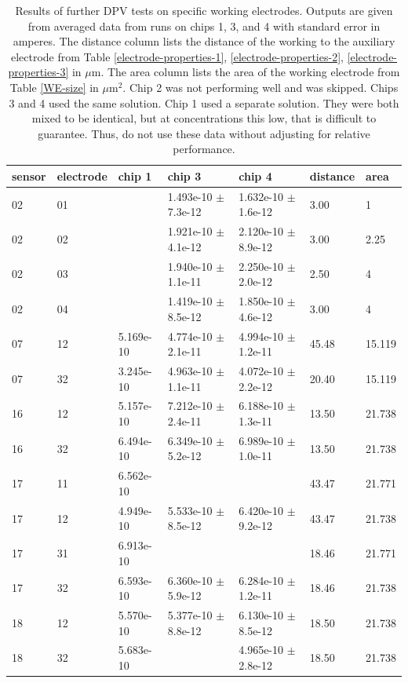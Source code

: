\begin{table}
	\begin{tabular}{lllllll}
		sensor & electrode & chip 1 & chip 3 & chip 4 & distance & area \\
		\hline
		02 & 01 &           & 1.493e-10 $\pm$ 7.3e-12 & 1.632e-10 $\pm$ 1.6e-12 &  3.00 & 1 \\
		02 & 02 &           & 1.921e-10 $\pm$ 4.1e-12 & 2.120e-10 $\pm$ 8.9e-12 &  3.00 & 2.25 \\
		02 & 03 &           & 1.940e-10 $\pm$ 1.1e-11 & 2.250e-10 $\pm$ 2.0e-12 &  2.50 & 4 \\
		02 & 04 &           & 1.419e-10 $\pm$ 8.5e-12 & 1.850e-10 $\pm$ 4.6e-12 &  3.00 & 4 \\
		07 & 12 & 5.169e-10 & 4.774e-10 $\pm$ 2.1e-11 & 4.994e-10 $\pm$ 1.2e-11 & 45.48 & 15.119 \\
		07 & 32 & 3.245e-10 & 4.963e-10 $\pm$ 1.1e-11 & 4.072e-10 $\pm$ 2.2e-12 & 20.40 & 15.119 \\
		16 & 12 & 5.157e-10 & 7.212e-10 $\pm$ 2.4e-11 & 6.188e-10 $\pm$ 1.3e-11 & 13.50 & 21.738 \\
		16 & 32 & 6.494e-10 & 6.349e-10 $\pm$ 5.2e-12 & 6.989e-10 $\pm$ 1.0e-11 & 13.50 & 21.738 \\
		17 & 11 & 6.562e-10 &                         &                         & 43.47 & 21.771 \\
		17 & 12 & 4.949e-10 & 5.533e-10 $\pm$ 8.5e-12 & 6.420e-10 $\pm$ 9.2e-12 & 43.47 & 21.738 \\
		17 & 31 & 6.913e-10 &                         &                         & 18.46 & 21.771 \\
		17 & 32 & 6.593e-10 & 6.360e-10 $\pm$ 5.9e-12 & 6.284e-10 $\pm$ 1.2e-11 & 18.46 & 21.738 \\
		18 & 12 & 5.570e-10 & 5.377e-10 $\pm$ 8.8e-12 & 6.130e-10 $\pm$ 8.5e-12 & 18.50 & 21.738 \\
		18 & 32 & 5.683e-10 &                         & 4.965e-10 $\pm$ 2.8e-12 & 18.50 & 21.738
	\end{tabular}
	\caption[Results of further DPV tests on specific working electrodes]{Results of further DPV tests on specific working electrodes. Outputs are given from averaged data from runs on chips 1, 3, and 4 with standard error in amperes. The distance column lists the distance of the working to the auxiliary electrode from Table \ref{electrode-properties-1}, \ref{electrode-properties-2}, \ref{electrode-properties-3} in $\mu \mathrm{m}$. The area column lists the area of the working electrode from Table \ref{WE-size} in $\mu \mathrm{m}^2$. Chip 2 was not performing well and was skipped. Chips 3 and 4 used the same solution. Chip 1 used a separate solution. They were both mixed to be identical, but at concentrations this low, that is difficult to guarantee. Thus, do not use these data without adjusting for relative performance.}
	\label{dpv-specific}
\end{table}


